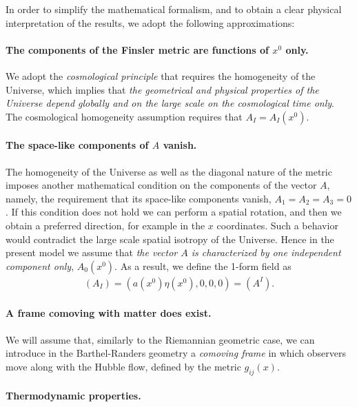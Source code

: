 \documentclass[aps,superscriptaddress, showpacs,preprintnumbers, superscriptaddress, nofootinbibt,twocolumn]{revtex4-2}
\begin{document}
In order to simplify the mathematical formalism, and to obtain a clear
physical interpretation of the results, we adopt the following
approximations:

\paragraph{The components of the Finsler metric are functions of $x^0$ only.}

We adopt the \textit{cosmological principle} that requires the
homogeneity of the Universe, which implies that \textit{the geometrical and
physical properties of the Universe depend globally and on the large scale
on the cosmological time only}. The cosmological homogeneity assumption
requires that $A_I=A_I\left(x^0\right)$.

\paragraph{The space-like components of $A$ vanish.}

The homogeneity of the Universe as well as the diagonal nature of the metric
imposes another mathematical condition on the components of the vector $A$,
namely, the requirement that its space-like components vanish, $A_1=A_2=A_3=0
$. If this condition does not hold we can perform a spatial rotation, and
then we obtain a preferred direction, for example in the $x$ coordinates.
Such a behavior would contradict the large scale spatial isotropy of the
Universe. Hence in the present model we assume that \textit{the vector $A$
is characterized by one independent component only}, $A_0\left(x^0\right)$. As a result,
we define the 1-form field as
\begin{align}\label{special A_i}
(A_{I})=(a\left(x^0\right)\eta\left(x^0\right),0,0,0)=(A^{I}).
\end{align}

\paragraph{A frame comoving with matter does exist.}

We will assume that, similarly to the Riemannian geometric case, we can introduce in the Barthel-Randers geometry a {\it comoving frame} in which observers move along with the Hubble flow, defined by the metric $g_{ij}(x)$.


\paragraph{Thermodynamic properties.}
\end{document}
